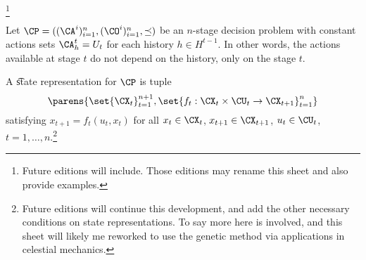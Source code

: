 
\footnote{Future editions will include. Those editions may rename this sheet and also provide examples.}


Let $\CP = ((\CA^i)_{i = 1}^{n}, (\CO^i)_{i = 1}^{n}, \preceq)$ be an $n$-stage decision problem with constant actions sets $\CA^t_{h} = U_t$ for each history $h \in H^{t-1}$.
In other words, the actions available at stage $t$ do not depend on the history, only on the stage $t$.


A \t{state representation} for $\CP$ is tuple
\[
	\parens{\set{\CX_t}_{t = 1}^{n+1}, \set{f_{t}: \CX_t \times \CU_t \to \CX_{t+1}}_{t = 1}^{n}}
\]
satisfying $x_{t+1} = f_t(u_t, x_t)$ for all $x_t \in \CX_t$, $x_{t+1} \in \CX_{t+1}$, $u_t \in \CU_t$, $t = 1, \dots, n$.\footnote{Future editions will continue this development, and add the other necessary conditions on state representations. To say more here is involved, and this sheet will likely me reworked to use the genetic method via applications in celestial mechanics.}


\blankpage
